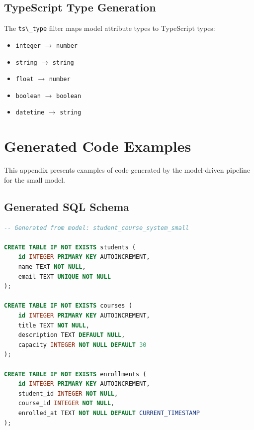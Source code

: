 \documentclass[11pt,a4paper]{article}
\begin{document}
{\subsection{TypeScript Type Generation}

The {\lstinline|ts\_type|} filter maps model attribute types to TypeScript types:
\begin{itemize}
    \item {\lstinline|integer|} $\rightarrow$ {\lstinline|number|}
    \item {\lstinline|string|} $\rightarrow$ {\lstinline|string|}
    \item {\lstinline|float|} $\rightarrow$ {\lstinline|number|}
    \item {\lstinline|boolean|} $\rightarrow$ {\lstinline|boolean|}
    \item {\lstinline|datetime|} $\rightarrow$ {\lstinline|string|}
\end{itemize}

\newpage
\section{Generated Code Examples}
\label{sec:code-examples}

This appendix presents examples of code generated by the model-driven pipeline for the small model.

\subsection{Generated SQL Schema}

\begin{lstlisting}[language=SQL, caption={Generated schema.sql for the small model}]
-- Generated from model: student_course_system_small

CREATE TABLE IF NOT EXISTS students (
    id INTEGER PRIMARY KEY AUTOINCREMENT,
    name TEXT NOT NULL,
    email TEXT UNIQUE NOT NULL
);

CREATE TABLE IF NOT EXISTS courses (
    id INTEGER PRIMARY KEY AUTOINCREMENT,
    title TEXT NOT NULL,
    description TEXT DEFAULT NULL,
    capacity INTEGER NOT NULL DEFAULT 30
);

CREATE TABLE IF NOT EXISTS enrollments (
    id INTEGER PRIMARY KEY AUTOINCREMENT,
    student_id INTEGER NOT NULL,
    course_id INTEGER NOT NULL,
    enrolled_at TEXT NOT NULL DEFAULT CURRENT_TIMESTAMP
);
\end{lstlisting}

}
\end{document}

